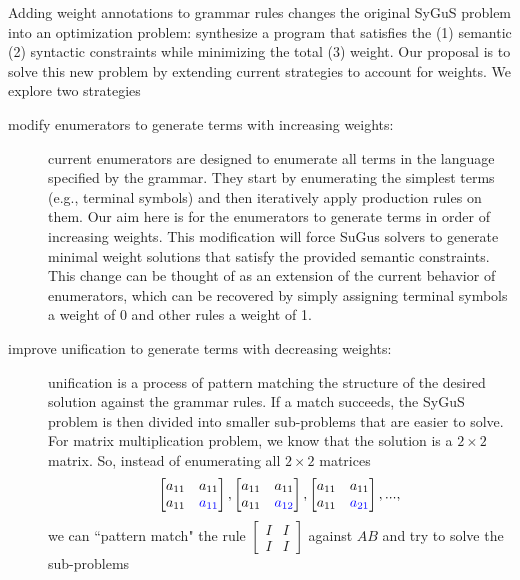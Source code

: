Adding weight annotations to grammar rules changes the original SyGuS problem into an optimization problem:
%
synthesize a program that satisfies the (1) semantic (2) syntactic constraints while minimizing the total (3) weight.
%
Our proposal is to solve this new problem by extending current strategies to account for weights.
%
We explore two strategies
%
\begin{description}
\item[modify enumerators to generate terms with increasing weights:]
%
current enumerators are designed to enumerate all terms in the language specified by the grammar.
%
They start by enumerating the simplest terms (e.g., terminal symbols) and then iteratively apply production rules on them.
%
Our aim here is for the enumerators to generate terms in order of increasing weights.
%
This modification will force SuGus solvers to generate minimal weight solutions 
%
that satisfy the provided semantic constraints.
%
%
This change can be thought of as an extension of the current behavior of enumerators, 
%
which can be recovered by simply assigning terminal symbols a weight of 0 and other rules a weight of 1.
%
\item[improve unification to generate terms with decreasing weights:]
%
unification is a process of pattern matching the structure of the desired solution against the grammar rules.
%
If a match succeeds, the SyGuS problem is then divided into smaller sub-problems that are easier to solve.
%
For matrix multiplication problem, we know that the solution is a $2 \times 2$ matrix. So, instead of enumerating all $2 \times 2$ matrices
%
\begin{equation}
\begin{bmatrix} a_{11} & a_{11} \\ a_{11} & \textcolor{blue}{a_{11}} \end{bmatrix},
\begin{bmatrix} a_{11} & a_{11} \\ a_{11} & \textcolor{blue}{a_{12}} \end{bmatrix},
\begin{bmatrix} a_{11} & a_{11} \\ a_{11} & \textcolor{blue}{a_{21}} \end{bmatrix},
...,
\label{eq:sequence-matrices}
\end{equation}
%
we can ``pattern match" the rule $\begin{bmatrix} I & I \\ I & I \end{bmatrix}$ against $AB$ and try to solve the sub-problems

\end{description}
